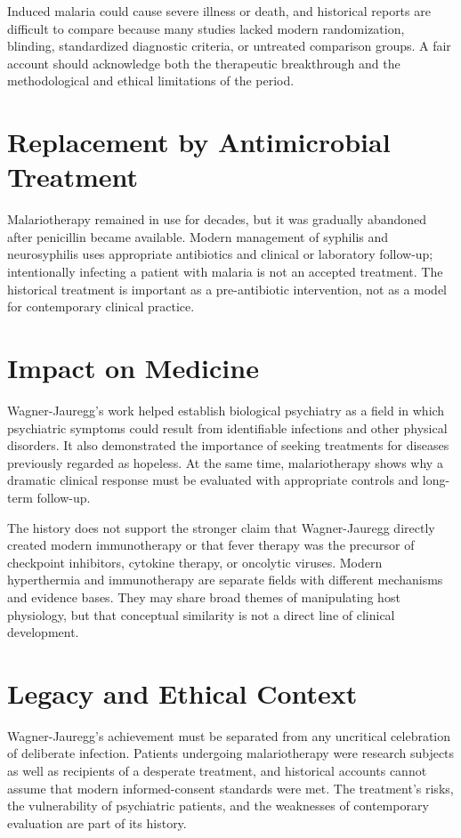 Induced malaria could cause severe illness or death, and historical reports are difficult to compare because many studies lacked modern randomization, blinding, standardized diagnostic criteria, or untreated comparison groups. A fair account should acknowledge both the therapeutic breakthrough and the methodological and ethical limitations of the period.

\section{Replacement by Antimicrobial Treatment}

Malariotherapy remained in use for decades, but it was gradually abandoned after penicillin became available. Modern management of syphilis and neurosyphilis uses appropriate antibiotics and clinical or laboratory follow-up; intentionally infecting a patient with malaria is not an accepted treatment. The historical treatment is important as a pre-antibiotic intervention, not as a model for contemporary clinical practice.

\section{Impact on Medicine}

Wagner-Jauregg's work helped establish biological psychiatry as a field in which psychiatric symptoms could result from identifiable infections and other physical disorders. It also demonstrated the importance of seeking treatments for diseases previously regarded as hopeless. At the same time, malariotherapy shows why a dramatic clinical response must be evaluated with appropriate controls and long-term follow-up.

The history does not support the stronger claim that Wagner-Jauregg directly created modern immunotherapy or that fever therapy was the precursor of checkpoint inhibitors, cytokine therapy, or oncolytic viruses. Modern hyperthermia and immunotherapy are separate fields with different mechanisms and evidence bases. They may share broad themes of manipulating host physiology, but that conceptual similarity is not a direct line of clinical development.

\section{Legacy and Ethical Context}

Wagner-Jauregg's achievement must be separated from any uncritical celebration of deliberate infection. Patients undergoing malariotherapy were research subjects as well as recipients of a desperate treatment, and historical accounts cannot assume that modern informed-consent standards were met. The treatment's risks, the vulnerability of psychiatric patients, and the weaknesses of contemporary evaluation are part of its history.

